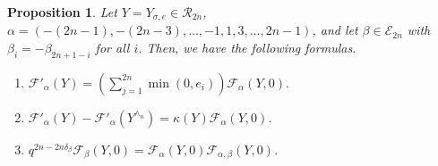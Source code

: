 \documentclass[11pt,oneside]{amsart}
\theoremstyle{plain}
\newtheorem{proposition}[theorem]{Proposition}
\theoremstyle{definition}
\theoremstyle{remark}
\newcommand{\CE}{{\mathcal E}}
\newcommand{\CF}{{\mathcal F}}
\newcommand{\CR}{{\mathcal R}}
\numberwithin{equation}{section}
\begin{document}
	
	\begin{proposition}\label{proposition3.4}
		Let $Y=Y_{\sigma,e} \in \CR_{2n}$, $\alpha=(-(2n-1),-(2n-3),\dots,-1,1,3,\dots,2n-1)$, and let $\beta \in \CE_{2n}$ with $\beta_i=-\beta_{2n+1-i}$ for all $i$. Then, we have the following formulas.
		\begin{enumerate}
			\item $\CF'_{\alpha}(Y)=(\sum_{j=1}^{2n}\min(0,e_i))\CF_{\alpha}(Y,0).$
			
			\item $\CF'_{\alpha}(Y)-\CF'_{\alpha}(Y^{\wedge_n})=\kappa(Y)\CF_{\alpha}(Y,0)$.
			
			\item $q^{2n-2n\delta_{\beta}}\CF_{\beta}(Y,0)=\CF_{\alpha}(Y,0)\CF_{\alpha,\beta}(Y,0)$.
		\end{enumerate}
		
		
	\end{proposition}
\end{document}
